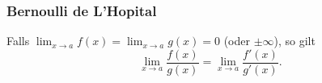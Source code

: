 \subsubsection{Bernoulli de L'Hopital}
    Falls $\displaystyle \lim_{x \to a} f(x) = \lim_{x \to a} g(x) = 0$ (oder $\pm \infty$), so gilt
    $$
         \lim_{x \to a} \frac{f(x)}{g(x)} = \lim_{x \to a} \frac{f'(x)}{g'(x)}.
    $$